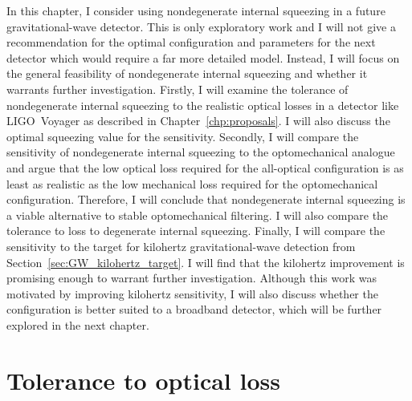 
In this chapter, I consider using nondegenerate internal squeezing in a future gravitational-wave detector. This is only exploratory work and I will not give a recommendation for the optimal configuration and parameters for the next detector which would require a far more detailed model. Instead, I will focus on the general feasibility of nondegenerate internal squeezing and whether it warrants further investigation.
Firstly, I will examine the tolerance of nondegenerate internal squeezing to the realistic optical losses in a detector like LIGO~Voyager as described in Chapter~\ref{chp:proposals}. I will also discuss the optimal squeezing value for the sensitivity. Secondly, I will compare the sensitivity of nondegenerate internal squeezing to the optomechanical analogue and argue that the low optical loss required for the all-optical configuration is as least as realistic as the low mechanical loss required for the optomechanical configuration. Therefore, I will conclude that nondegenerate internal squeezing is a viable alternative to stable optomechanical filtering. I will also compare the tolerance to loss to degenerate internal squeezing. Finally, I will compare the sensitivity to the target for kilohertz gravitational-wave detection from Section~\ref{sec:GW_kilohertz_target}. I will find that the kilohertz improvement is promising enough to warrant further investigation. Although this work was motivated by improving kilohertz sensitivity, I will also discuss whether the configuration is better suited to a broadband detector, which will be further explored in the next chapter.


\section{Tolerance to optical loss}
\label{sec:nIS_tolerance_to_losses}

